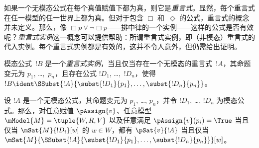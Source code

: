 \documentclass[../../../include/open-logic-section]{subfiles}
\begin{document}


\begin{explain}
如果一个无模态公式在每个真值赋值下都为真，则它是\emph{重言式}。显然，每个重言式在任一模型的任一世界上都为真。但对于包含 $\Box$ 和~$\Diamond$ 的公式，重言式的概念并未定义。那么，像 $\Box p \lor \lnot \Box p$——排中律的一个实例——这样的公式是否有效呢？\emph{重言式实例}这一概念可以提供帮助：所谓重言式实例，即（非模态）重言式的代入实例。每个重言式实例都是有效的，这并不令人意外，但仍需给出证明。
\end{explain}

\begin{defn}
  模态公式~$!B$ 是一个\emph{重言式实例}，当且仅当存在一个无模态的重言式~$!A$，其命题变元为 $p_1$, \dots,~$p_n$，且存在公式 $!D_1$, \dots,~$!D_n$，使得 $!B \ident \SSubst{!A}{\subst{!D_1}{p_1},
    \dots, \subst{!D_n}{p_n}}$。
\end{defn}

\begin{lem}
  设 $!A$ 是一个无模态公式，其命题变元为 $p_1$, \dots, $p_n$，并令 $!D_1$, \dots, $!D_n$ 为模态公式。那么，对任意赋值 $\pAssign{v}$、任意模型 $\mModel{M} = \tuple{W, R, V}$ 以及任意满足 $\pAssign{v}(p_i) = \True$ 当且仅当 $\mSat{M}{!D_i}[w]$ 的 $w \in W$，都有 $\pSat{v}{!A}$ 当且仅当 $\mSat{M}{\SSubst{!A}{\subst{!D_1}{p_1}, \dots,
      \subst{!D_n}{p_n}}}[w]$。
\end{lem}
\end{document}
